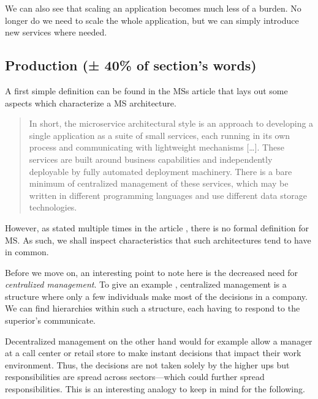 We can also see that scaling an application becomes much less of a
burden. No longer do we need to scale the whole application, but we
can simply introduce new services where needed.

\subsection{Production (± 40\% of section's words)}

A first simple definition can be found in the MSs article
\cite{ms-definition} that lays out some aspects which characterize a
MS architecture.

\begin{quote}
	In short, the microservice architectural style is an approach to
	developing a single application as a suite of small services,
	each running in its own process and communicating with
	lightweight mechanisms [\ldots]. These services
	are built around business capabilities and independently
	deployable by fully automated deployment machinery. There is a
	bare minimum of centralized management of these services, which
	may be written in different programming languages and use different
	data storage technologies. 
\end{quote}

However, as stated multiple times in the article \cite{ms-definition},
there is no formal definition for MS. As such, we shall inspect
characteristics that such architectures tend to have in common.

Before we move on, an interesting point to note here is the decreased
need for \textit{centralized management}. To give an example
\cite{central-decentral}, centralized management is a structure where
only a few individuals make most of the decisions in a company. We can
find hierarchies within such a structure, each having to respond to
the superior's communicate. 

Decentralized management on the other hand would for example allow a
manager at a call center or retail store to make instant decisions
that impact their work environment. Thus, the decisions are not taken
solely by the higher ups but responsibilities are spread across
sectors—which could further spread responsibilities. This is an
interesting analogy to keep in mind for the following.

